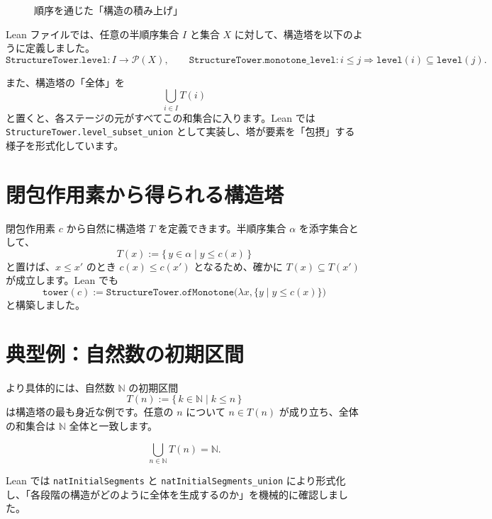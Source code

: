 \documentclass[12pt]{ltjsarticle}
\begin{document}
\begin{figure}[h]
  \centering
  \caption{順序を通じた「構造の積み上げ」}
  \label{fig:tower}
\end{figure}

Lean ファイルでは、任意の半順序集合 $I$ と集合 $X$ に対して、構造塔を以下のように定義しました。
\[
  \texttt{StructureTower.level} \colon I \to \mathcal{P}(X), \qquad
  \texttt{StructureTower.monotone\_level} \colon i \le j \Rightarrow \texttt{level}(i) \subseteq \texttt{level}(j).
\]

また、構造塔の「全体」を
\[
  \bigcup_{i \in I} T(i)
\]
と置くと、各ステージの元がすべてこの和集合に入ります。Lean では \texttt{StructureTower.level\_subset\_union} として実装し、塔が要素を「包摂」する様子を形式化しています。

\section{閉包作用素から得られる構造塔}

閉包作用素 $c$ から自然に構造塔 $T$ を定義できます。半順序集合 $\alpha$ を添字集合として、
\[
  T(x) := \{\, y \in \alpha \mid y \le c(x) \,\}
\]
と置けば、$x \le x'$ のとき $c(x) \le c(x')$ となるため、確かに $T(x) \subseteq T(x')$ が成立します。Lean でも
\[
  \texttt{tower}(c) := \texttt{StructureTower.ofMonotone} \bigl(\lambda x, \{ y \mid y \le c(x) \}\bigr)
\]
と構築しました。

\section{典型例：自然数の初期区間}

より具体的には、自然数 $\mathbb{N}$ の初期区間
\[
  T(n) := \{\, k \in \mathbb{N} \mid k \le n \,\}
\]
は構造塔の最も身近な例です。任意の $n$ について $n \in T(n)$ が成り立ち、全体の和集合は $\mathbb{N}$ 全体と一致します。

\[
  \bigcup_{n \in \mathbb{N}} T(n) = \mathbb{N}.
\]

Lean では \texttt{natInitialSegments} と \texttt{natInitialSegments\_union} により形式化し、「各段階の構造がどのように全体を生成するのか」を機械的に確認しました。
\end{document}
